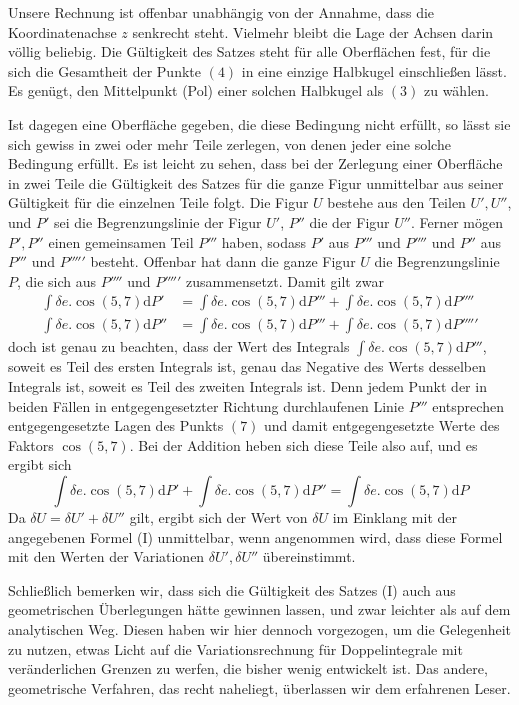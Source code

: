 Unsere Rechnung ist offenbar unabhängig von der Annahme, dass die Koordinatenachse $z$ senkrecht steht. Vielmehr bleibt die Lage der Achsen darin völlig beliebig. Die Gültigkeit des Satzes steht für alle Oberflächen fest, für die sich die Gesamtheit der Punkte $(4)$ in eine einzige Halbkugel einschließen lässt. Es genügt, den Mittelpunkt (Pol) einer solchen Halbkugel als $(3)$ zu wählen.

Ist dagegen eine Oberfläche gegeben, die diese Bedingung nicht erfüllt, so lässt sie sich gewiss in zwei oder mehr Teile zerlegen, von denen jeder eine solche Bedingung erfüllt. Es ist leicht zu sehen, dass bei der Zerlegung einer Oberfläche in zwei Teile die Gültigkeit des Satzes für die ganze Figur unmittelbar aus seiner Gültigkeit für die einzelnen Teile folgt. Die Figur $U$ bestehe aus den Teilen $U',U''$, und $P'$ sei die Begrenzungslinie der Figur $U'$, $P''$ die der Figur $U''$. Ferner mögen $P',P''$ einen gemeinsamen Teil $P'''$ haben, sodass $P'$ aus $P'''$ und $P''''$ und $P''$ aus $P'''$ und $P'''''$ besteht. Offenbar hat dann die ganze Figur $U$ die Begrenzungslinie $P$, die sich aus $P''''$ und $P'''''$ zusammensetzt. Damit gilt zwar
\[
\begin{aligned}
\int\delta e.\cos(5,7)\mathrm{d}P'&=\int\delta e.\cos(5,7)\mathrm{d}P'''+\int\delta e.\cos(5,7)\mathrm{d}P''''\\
\int\delta e.\cos(5,7)\mathrm{d}P''&=\int\delta e.\cos(5,7)\mathrm{d}P'''+\int\delta e.\cos(5,7)\mathrm{d}P'''''
\end{aligned}
\]
doch ist genau zu beachten, dass der Wert des Integrals $\int\delta e.\cos(5,7)\mathrm{d}P'''$, soweit es Teil des ersten Integrals ist, genau das Negative des Werts desselben Integrals ist, soweit es Teil des zweiten Integrals ist. Denn jedem Punkt der in beiden Fällen in entgegengesetzter Richtung durchlaufenen Linie $P'''$ entsprechen entgegengesetzte Lagen des Punkts $(7)$ und damit entgegengesetzte Werte des Faktors $\cos(5,7)$. Bei der Addition heben sich diese Teile also auf, und es ergibt sich
\[
\int\delta e.\cos(5,7)\mathrm{d}P'+\int\delta e.\cos(5,7)\mathrm{d}P''=\int\delta e.\cos(5,7)\mathrm{d}P
\]
Da $\delta U=\delta U'+\delta U''$ gilt, ergibt sich der Wert von $\delta U$ im Einklang mit der angegebenen Formel (I) unmittelbar, wenn angenommen wird, dass diese Formel mit den Werten der Variationen $\delta U',\delta U''$ übereinstimmt.

Schließlich bemerken wir, dass sich die Gültigkeit des Satzes (I) auch aus geometrischen Überlegungen hätte gewinnen lassen, und zwar leichter als auf dem analytischen Weg. Diesen haben wir hier dennoch vorgezogen, um die Gelegenheit zu nutzen, etwas Licht auf die Variationsrechnung für Doppelintegrale mit veränderlichen Grenzen zu werfen, die bisher wenig entwickelt ist. Das andere, geometrische Verfahren, das recht naheliegt, überlassen wir dem erfahrenen Leser.

